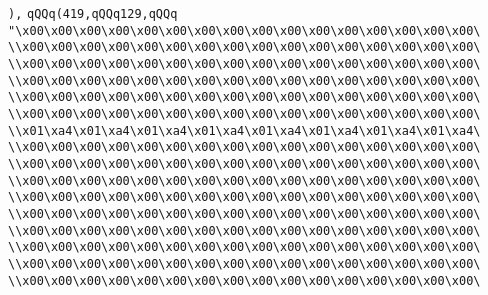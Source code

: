 \verb|),|\newline
\verb|qQQq(419,qQQq129,qQQq|\newline
\verb|"\x00\x00\x00\x00\x00\x00\x00\x00\x00\x00\x00\x00\x00\x00\x00\x00\|\newline
\verb|\\x00\x00\x00\x00\x00\x00\x00\x00\x00\x00\x00\x00\x00\x00\x00\x00\|\newline
\verb|\\x00\x00\x00\x00\x00\x00\x00\x00\x00\x00\x00\x00\x00\x00\x00\x00\|\newline
\verb|\\x00\x00\x00\x00\x00\x00\x00\x00\x00\x00\x00\x00\x00\x00\x00\x00\|\newline
\verb|\\x00\x00\x00\x00\x00\x00\x00\x00\x00\x00\x00\x00\x00\x00\x00\x00\|\newline
\verb|\\x00\x00\x00\x00\x00\x00\x00\x00\x00\x00\x00\x00\x00\x00\x00\x00\|\newline
\verb|\\x01\xa4\x01\xa4\x01\xa4\x01\xa4\x01\xa4\x01\xa4\x01\xa4\x01\xa4\|\newline
\verb|\\x00\x00\x00\x00\x00\x00\x00\x00\x00\x00\x00\x00\x00\x00\x00\x00\|\newline
\verb|\\x00\x00\x00\x00\x00\x00\x00\x00\x00\x00\x00\x00\x00\x00\x00\x00\|\newline
\verb|\\x00\x00\x00\x00\x00\x00\x00\x00\x00\x00\x00\x00\x00\x00\x00\x00\|\newline
\verb|\\x00\x00\x00\x00\x00\x00\x00\x00\x00\x00\x00\x00\x00\x00\x00\x00\|\newline
\verb|\\x00\x00\x00\x00\x00\x00\x00\x00\x00\x00\x00\x00\x00\x00\x00\x00\|\newline
\verb|\\x00\x00\x00\x00\x00\x00\x00\x00\x00\x00\x00\x00\x00\x00\x00\x00\|\newline
\verb|\\x00\x00\x00\x00\x00\x00\x00\x00\x00\x00\x00\x00\x00\x00\x00\x00\|\newline
\verb|\\x00\x00\x00\x00\x00\x00\x00\x00\x00\x00\x00\x00\x00\x00\x00\x00\|\newline
\verb|\\x00\x00\x00\x00\x00\x00\x00\x00\x00\x00\x00\x00\x00\x00\x00\x00\|\newline
